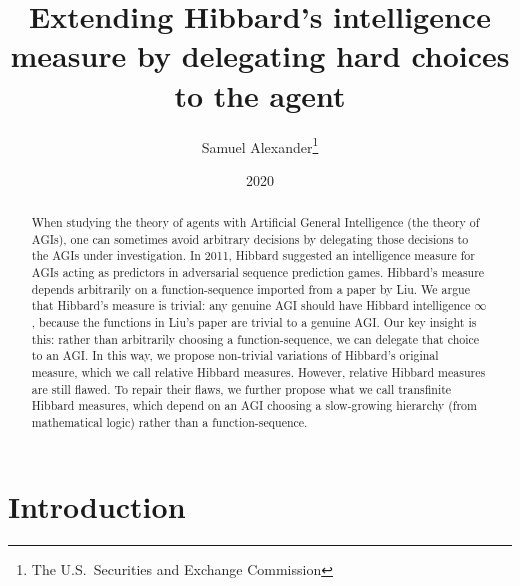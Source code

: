\documentclass{article}
\title{Extending Hibbard's intelligence measure by delegating hard choices to the agent}
\author{Samuel Alexander\thanks{The U.S.\ Securities and Exchange Commission}}
\date{2020}
\begin{document}
\maketitle

\begin{abstract}
When studying the theory of agents with Artificial General Intelligence
(the theory of AGIs), one can sometimes avoid arbitrary decisions by
delegating those decisions to the AGIs under investigation.
In 2011, Hibbard suggested an intelligence measure for AGIs acting as
predictors in adversarial sequence prediction games. Hibbard's measure
depends arbitrarily on a function-sequence
imported from a paper by Liu. We argue that Hibbard's measure is trivial:
any genuine AGI should have Hibbard intelligence $\infty$,
because the functions in Liu's paper are
trivial to a genuine AGI. Our key insight is this: rather than
arbitrarily choosing a function-sequence, we can delegate that choice to an AGI.
In this way, we propose
non-trivial variations of Hibbard's original measure, which we call
relative Hibbard measures.
However, relative Hibbard measures are still flawed. To repair their flaws,
we further propose what we call transfinite Hibbard measures,
which depend on an AGI choosing a slow-growing hierarchy (from mathematical
logic) rather than a function-sequence.
\end{abstract}

\section{Introduction}
\end{document}
